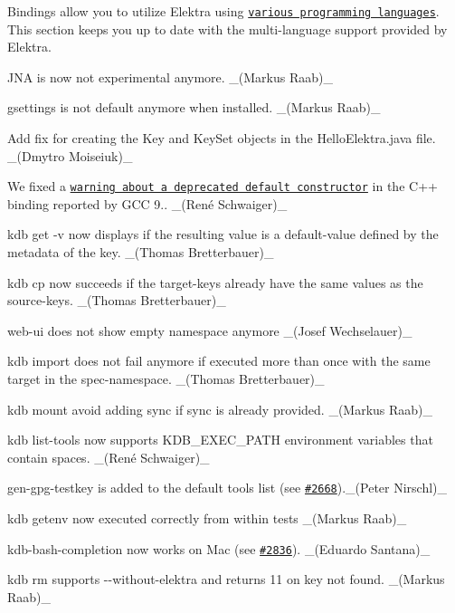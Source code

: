 Bindings allow you to utilize Elektra using \href{https://www.libelektra.org/bindings/readme}{\tt various programming languages}. This section keeps you up to date with the multi-\/language support provided by Elektra.


\begin{DoxyItemize}
\item J\+NA is now not experimental anymore. \+\_\+(\+Markus Raab)\+\_\+
\item gsettings is not default anymore when installed. \+\_\+(\+Markus Raab)\+\_\+
\item Add fix for creating the Key and Key\+Set objects in the Hello\+Elektra.\+java file. \+\_\+(\+Dmytro Moiseiuk)\+\_\+
\item We fixed a \href{https://issues.libelektra.org/2670}{\tt warning about a deprecated default constructor} in the C++ binding reported by G\+CC 9.. \+\_\+(René Schwaiger)\+\_\+
\end{DoxyItemize}


\begin{DoxyItemize}
\item {\ttfamily kdb get -\/v} now displays if the resulting value is a default-\/value defined by the metadata of the key. \+\_\+(\+Thomas Bretterbauer)\+\_\+
\item {\ttfamily kdb cp} now succeeds if the target-\/keys already have the same values as the source-\/keys. \+\_\+(\+Thomas Bretterbauer)\+\_\+
\item {\ttfamily web-\/ui} does not show empty namespace anymore \+\_\+(\+Josef Wechselauer)\+\_\+
\item {\ttfamily kdb import} does not fail anymore if executed more than once with the same target in the spec-\/namespace. \+\_\+(\+Thomas Bretterbauer)\+\_\+
\item {\ttfamily kdb mount} avoid adding sync if sync is already provided. \+\_\+(\+Markus Raab)\+\_\+
\item {\ttfamily kdb list-\/tools} now supports {\ttfamily K\+D\+B\+\_\+\+E\+X\+E\+C\+\_\+\+P\+A\+TH} environment variables that contain spaces. \+\_\+(René Schwaiger)\+\_\+
\item {\ttfamily gen-\/gpg-\/testkey} is added to the default tools list (see \href{https://github.com/ElektraInitiative/libelektra/issues/2668}{\tt \#2668}).\+\_\+(\+Peter Nirschl)\+\_\+
\item {\ttfamily kdb getenv} now executed correctly from within tests \+\_\+(\+Markus Raab)\+\_\+
\item {\ttfamily kdb-\/bash-\/completion} now works on Mac (see \href{https://github.com/ElektraInitiative/libelektra/pull/2836}{\tt \#2836}). \+\_\+(\+Eduardo Santana)\+\_\+
\item {\ttfamily kdb rm} supports {\ttfamily -\/-\/without-\/elektra} and returns 11 on key not found. \+\_\+(\+Markus Raab)\+\_\+
\end{DoxyItemize}

